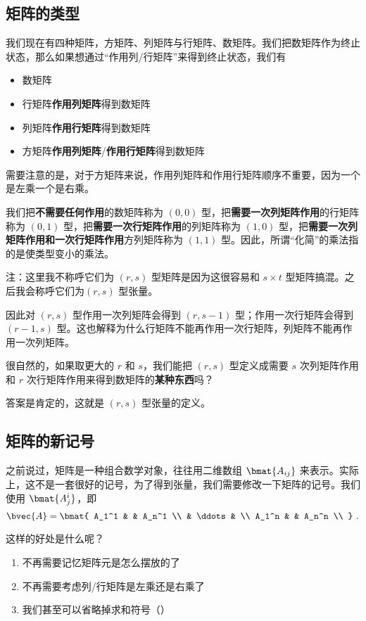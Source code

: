 \subsection{矩阵的类型}
我们现在有四种矩阵，方矩阵、列矩阵与行矩阵、数矩阵。我们把数矩阵作为终止状态，那么如果想通过“作用列/行矩阵”来得到终止状态，我们有
\begin{itemize}
\item 数矩阵
\item 行矩阵\textbf{作用列矩阵}得到数矩阵
\item 列矩阵\textbf{作用行矩阵}得到数矩阵
\item 方矩阵\textbf{作用列矩阵}/\textbf{作用行矩阵}得到数矩阵
\end{itemize}
需要注意的是，对于方矩阵来说，作用列矩阵和作用行矩阵顺序不重要，因为一个是左乘一个是右乘。

我们把\textbf{不需要任何作用}的数矩阵称为 $(0,0)$ 型，把\textbf{需要一次列矩阵作用}的行矩阵称为 $(0,1)$ 型，把\textbf{需要一次行矩阵作用}的列矩阵称为 $(1,0)$ 型，把\textbf{需要一次列矩阵作用和一次行矩阵作用}方列矩阵称为 $(1,1)$ 型。因此，所谓“化简”的乘法指的是使类型变小的乘法。

注：这里我不称呼它们为 $(r, s)$ 型矩阵是因为这很容易和 $s \times t$ 型矩阵搞混。之后我会称呼它们为$(r, s)$ 型张量。

因此对 $(r, s)$ 型作用一次列矩阵会得到 $(r, s - 1)$ 型；作用一次行矩阵会得到 $(r - 1, s)$ 型。这也解释为什么行矩阵不能再作用一次行矩阵，列矩阵不能再作用一次列矩阵。

很自然的，如果取更大的 $r$ 和 $s$，我们能把 $(r, s)$ 型定义成需要 $s$ 次列矩阵作用和 $r$ 次行矩阵作用来得到数矩阵的\textbf{某种东西}吗？

答案是肯定的，这就是 $(r, s)$ 型张量的定义。

\subsection{矩阵的新记号}

之前说过，矩阵是一种组合数学对象，往往用二维数组 $\bmat{A_{i j}}$ 来表示。实际上，这不是一套很好的记号，为了得到张量，我们需要修改一下矩阵的记号。我们使用 $\bmat{A^i_j}$，即
$$
\bvec{A} = \bmat{
A_1^1 &  & A_n^1 \\
 & \ddots & \\
A_1^n &  & A_n^n \\
}~.
$$

这样的好处是什么呢？
\begin{enumerate}
\item 不再需要记忆矩阵元是怎么摆放的了
\item 不再需要考虑列/行矩阵是左乘还是右乘了
\item 我们甚至可以省略掉求和符号（）
\end{enumerate}

